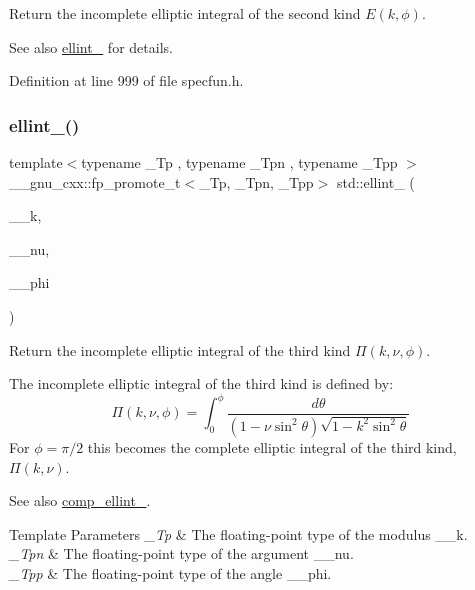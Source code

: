 Return the incomplete elliptic integral of the second kind $ E(k,\phi) $. 

\begin{DoxySeeAlso}{See also}
\hyperlink{group__mathsf__std_gad64cb9babb7837d585912b1a94b2cb7d}{ellint\+\_} for details. 
\end{DoxySeeAlso}


Definition at line 999 of file specfun.\+h.

\mbox{\label{group__mathsf__std_gaac0240d1e7e401e652b9d1adf4c7e029}} 
\subsubsection{\texorpdfstring{ellint\+\_()}{ellint\_3()}}
{\footnotesize\ttfamily template$<$typename \+\_\+\+Tp , typename \+\_\+\+Tpn , typename \+\_\+\+Tpp $>$ \\
\+\_\+\+\_\+gnu\+\_\+cxx\+::fp\+\_\+promote\+\_\+t$<$\+\_\+\+Tp, \+\_\+\+Tpn, \+\_\+\+Tpp$>$ std\+::ellint\+\_ (\begin{DoxyParamCaption}\item[{\+\_\+\+Tp}]{\+\_\+\+\_\+k,  }\item[{\+\_\+\+Tpn}]{\+\_\+\+\_\+nu,  }\item[{\+\_\+\+Tpp}]{\+\_\+\+\_\+phi }\end{DoxyParamCaption})\hspace{0.3cm}{\ttfamily [inline]}}



Return the incomplete elliptic integral of the third kind $ \Pi(k,\nu,\phi) $. 

The incomplete elliptic integral of the third kind is defined by\+: \[ \Pi(k,\nu,\phi) = \int_0^{\phi} \frac{d\theta} {(1 - \nu \sin^2\theta) \sqrt{1 - k^2 \sin^2\theta}} \] For $ \phi= \pi/2 $ this becomes the complete elliptic integral of the third kind, $ \Pi(k,\nu) $. \begin{DoxySeeAlso}{See also}
\hyperlink{group__mathsf__std_ga80419d323d3231870bd588525e818974}{comp\+\_\+ellint\+\_}.
\end{DoxySeeAlso}

\begin{DoxyTemplParams}{Template Parameters}
{\em \+\_\+\+Tp} & The floating-\/point type of the modulus {\ttfamily \+\_\+\+\_\+k}. \\
\hline
{\em \+\_\+\+Tpn} & The floating-\/point type of the argument {\ttfamily \+\_\+\+\_\+nu}. \\
\hline
{\em \+\_\+\+Tpp} & The floating-\/point type of the angle {\ttfamily \+\_\+\+\_\+phi}. \\
\hline
\end{DoxyTemplParams}

